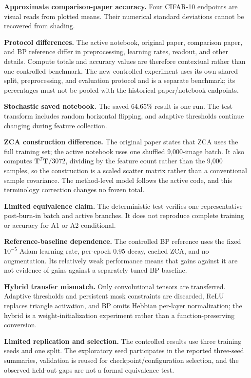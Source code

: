 \documentclass{article}
\begin{document}
\begin{enumerate}[noitemsep]
    \item \textbf{Approximate comparison-paper accuracy.} Four CIFAR-10 endpoints are visual reads from plotted means. Their numerical standard deviations cannot be recovered from shading.
    \item \textbf{Protocol differences.} The active notebook, original paper, comparison paper, and BP reference differ in preprocessing, learning rates, readout, and other details. Compute totals and accuracy values are therefore contextual rather than one controlled benchmark. {\color{red}The new controlled experiment uses its own shared split, preprocessing, and evaluation protocol and is a separate benchmark; its percentages must not be pooled with the historical paper/notebook endpoints.}
    \item \textbf{Stochastic saved notebook.} The saved 64.65\% result is one run. The test transform includes random horizontal flipping, and adaptive thresholds continue changing during feature collection.
    \item \textbf{ZCA construction difference.} The original paper states that ZCA uses the full training set; the active notebook uses one shuffled 9,000-image batch. It also computes $\mathbf{T}^T \mathbf{T} / 3072$, dividing by the feature count rather than the 9,000 samples, so the construction is a scaled scatter matrix rather than a conventional sample covariance. The method-level model follows the active code, and this terminology correction changes no frozen total.
    \item \textbf{Limited equivalence claim.} The deterministic test verifies one representative post-burn-in batch and active branches. It does not reproduce complete training or accuracy for A1 or A2 conditional.
    {\color{red}\item \textbf{Reference-baseline dependence.} The controlled BP reference uses the fixed $10^{-5}$ Adam learning rate, per-epoch $0.95$ decay, cached ZCA, and no augmentation. Its relatively weak performance means that gains against it are not evidence of gains against a separately tuned BP baseline.}
    {\color{red}\item \textbf{Hybrid transfer mismatch.} Only convolutional tensors are transferred. Adaptive thresholds and persistent mask constraints are discarded, ReLU replaces triangle activation, and BP omits Hebbian per-layer normalization; the hybrid is a weight-initialization experiment rather than a function-preserving conversion.}
    {\color{red}\item \textbf{Limited replication and selection.} The controlled results use three training seeds and one split. The exploratory seed participates in the reported three-seed summaries, validation is reused for checkpoint/configuration selection, and the observed held-out gaps are not a formal equivalence test.}

\end{enumerate}
\end{document}
